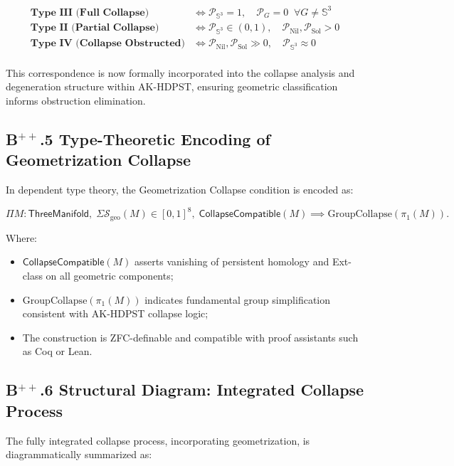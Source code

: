 \documentclass[11pt]{article}
\begin{document}
\[
\begin{array}{ll}
\textbf{Type III (Full Collapse)} & \iff \mathcal{P}_{\mathbb{S}^3} = 1,\quad \mathcal{P}_G = 0\;\; \forall G \neq \mathbb{S}^3 \\
\textbf{Type II (Partial Collapse)} & \iff \mathcal{P}_{\mathbb{S}^3} \in (0,1),\quad \mathcal{P}_{\mathrm{Nil}},\mathcal{P}_{\mathrm{Sol}} > 0 \\
\textbf{Type IV (Collapse Obstructed)} & \iff \mathcal{P}_{\mathrm{Nil}},\mathcal{P}_{\mathrm{Sol}} \gg 0,\quad \mathcal{P}_{\mathbb{S}^3} \approx 0 \\
\end{array}
\]

This correspondence is now formally incorporated into the collapse analysis and degeneration structure within AK-HDPST, ensuring geometric classification informs obstruction elimination.

\subsection*{B$^{++}$.5 Type-Theoretic Encoding of Geometrization Collapse}

In dependent type theory, the Geometrization Collapse condition is encoded as:

\[
\Pi M : \mathsf{ThreeManifold},\; \Sigma \mathcal{S}_{\mathrm{geo}}(M) \in [0,1]^8,\; \mathsf{CollapseCompatible}(M) \implies \mathrm{GroupCollapse}(\pi_1(M)).
\]

Where:

\begin{itemize}
    \item $\mathsf{CollapseCompatible}(M)$ asserts vanishing of persistent homology and Ext-class on all geometric components;
    \item $\mathrm{GroupCollapse}(\pi_1(M))$ indicates fundamental group simplification consistent with AK-HDPST collapse logic;
    \item The construction is ZFC-definable and compatible with proof assistants such as Coq or Lean.
\end{itemize}

\subsection*{B$^{++}$.6 Structural Diagram: Integrated Collapse Process}

The fully integrated collapse process, incorporating geometrization, is diagrammatically summarized as:
\end{document}
